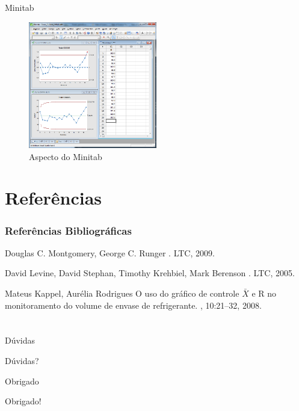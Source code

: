 \documentclass[12pt]{beamer}
\begin{document}
  \begin{frame}[t]{Minitab}
    \begin{figure}[ht]
      \includegraphics[width=0.5\textwidth]{img/minitab_img}
      \caption{Aspecto do Minitab}
    \end{figure}
  \end{frame}

%

  \section{Referências}

  \begin{frame}[t]
    \frametitle<presentation>{{Referências Bibliográficas}}

    \begin{thebibliography}{10}
      \beamertemplatebookbibitems
          Douglas C. Montgomery, George C. Runger
          .
          \newblock LTC, 2009.

          David Levine, David Stephan, Timothy Krehbiel, Mark Berenson
          .
          \newblock LTC, 2005.

      \beamertemplatearticlebibitems
          Mateus Kappel, Aurélia Rodrigues
          \newblock O uso do gráfico de controle $\bar{X}$  e R no monitoramento do volume de envase de refrigerante.
          , 10:21--32, 2008.
    \end{thebibliography}
  \end{frame}

%

  \section{}

  \begin{frame}{Dúvidas}
    \Huge{\centerline{Dúvidas?}}
  \end{frame}

  \begin{frame}{Obrigado}
    \Huge{\centerline{Obrigado!}}
  \end{frame}
\end{document}
